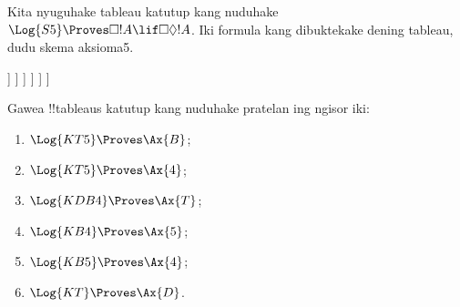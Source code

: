 \documentclass[../../../include/open-logic-section]{subfiles}
\begin{document}
\begin{ex}
  Kita nyuguhake tableau katutup kang nuduhake
  $\Log{S5} \Proves \Box!A \lif \Box\Diamond!A$. Iki formula kang dibuktekake dening tableau, dudu skema aksioma5.
  \begin{oltableau}
    [\pFmla{\False}{\Box\formula{A} \lif \Box\Diamond \formula{A}}{1},
      just = \TAss
      [\pFmla{\True}{\Box \formula{A}}{1}, just = {\TRule{\False}{\lif}[1]}
        [\pFmla{\False}{\Box\Diamond \formula{A}}{1},
          just = {\TRule{\False}{\lif}[1]}
          [\pFmla{\False}{\Diamond \formula{A}}{1.1},
            just = {\TRule{\False}{\Box}[3]}
            [\pFmla{\False}{\Diamond \formula{A}}{1},
              just = {4r$\Diamond$ 4}
              [\pFmla{\False}{\formula{A}}{1.1},
                just = {\TRule{\False}{\Diamond}[5]}
                [\pFmla{\True}{\formula{A}}{1.1},
                  just = {\TRule{\True}{\Box}[2]}, close]
              ]
            ]
          ]
        ]
      ]
    ]
  \end{oltableau}
\end{ex}

\begin{prob}
Gawea !!{tableau}s katutup kang nuduhake pratelan ing ngisor iki:
  \begin{enumerate}
  \item $\Log{KT5} \Proves \Ax{B}$;
  \item $\Log{KT5} \Proves \Ax{4}$;
  \item $\Log{KDB4} \Proves \Ax{T}$;
  \item $\Log{KB4} \Proves \Ax{5}$;
  \item $\Log{KB5} \Proves \Ax{4}$;
  \item $\Log{KT} \Proves \Ax{D}$.
  \end{enumerate}
\end{prob}
\end{document}
